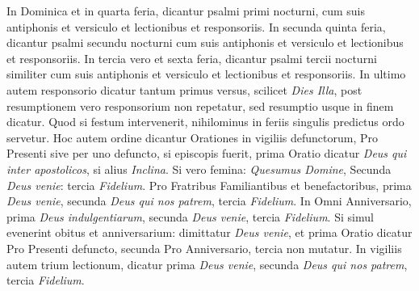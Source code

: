 \begin{multicols*}{2}
In Dominica et in quarta feria, dicantur psalmi primi nocturni, cum suis antiphonis et versiculo et lectionibus et responsoriis. In secunda quinta feria, dicantur psalmi secundu nocturni cum suis antiphonis et versiculo et lectionibus et responsoriis. In tercia vero et sexta feria, dicantur psalmi tercii nocturni similiter cum suis antiphonis et versiculo et lectionibus et responsoriis. In ultimo autem responsorio dicatur tantum primus versus, scilicet \textit{Dies Illa}, post resumptionem vero responsorium non repetatur, sed resumptio usque in finem dicatur. Quod si festum intervenerit, nihilominus in feriis singulis predictus ordo servetur.
Hoc autem ordine dicantur Orationes in vigiliis defunctorum, Pro Presenti sive per uno defuncto, si episcopis fuerit, prima Oratio dicatur \textit{Deus qui inter apostolicos}, si alius \textit{Inclina}. Si vero femina: \textit{Quesumus Domine}, Secunda \textit{Deus venie}: tercia \textit{Fidelium}. Pro Fratribus Familiantibus et benefactoribus, prima \textit{Deus venie}, secunda \textit{Deus qui nos patrem}, tercia \textit{Fidelium}.
In Omni Anniversario, prima \textit{Deus indulgentiarum}, secunda \textit{Deus venie}, tercia \textit{Fidelium}. Si simul evenerint obitus et anniversarium: dimittatur \textit{Deus venie}, et prima Oratio dicatur Pro Presenti defuncto, secunda Pro Anniversario, tercia non mutatur. In vigiliis autem trium lectionum, dicatur prima \textit{Deus venie}, secunda \textit{Deus qui nos patrem}, tercia \textit{Fidelium}.


\end{multicols*}
